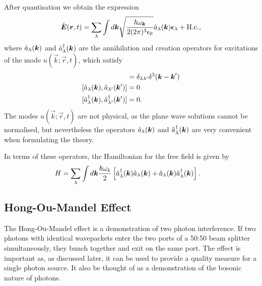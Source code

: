 After quantisation we obtain the expression
\begin{align}
  \hat{{\boldsymbol{E}}}({\boldsymbol{r}}, t) = \sum_\lambda \int d{\boldsymbol{k}} \sqrt{\frac{\hbar \omega_{{\boldsymbol{k}}}}{2(2\pi)^3\epsilon_0}}\hat{a}_\lambda({\boldsymbol{k}}){\boldsymbol{\epsilon}}_\lambda  + \text{H.c.},
\end{align}
where $\hat{a}_\lambda({\boldsymbol{k}})$ and $\hat{a}^\dagger_\lambda({\boldsymbol{k}})$ are the annihilation and creation operators for excitations of the mode $u(\vec{k}; \vec{r},t)$, which satisfy
\begin{align}
  [\an{a}_\lambda(\vec{k}), \cre{a}_{\lambda '}(\vec{k}')]  &= \delta_{\lambda\lambda '}\delta^3(\vec{k} - \vec{k}') \\
  [\an{a}_\lambda(\vec{k}), \an{a}_{\lambda '}(\vec{k}')]  &= 0 \\
  [\cre{a}_\lambda(\vec{k}), \cre{a}_{\lambda '}(\vec{k}')] &= 0.
\end{align}
The modes $u(\vec{k}; \vec{r}, t)$ are not physical, as the plane wave solutions cannot be normalised, but nevertheless the operators  $\hat{a}_\lambda({\boldsymbol{k}})$ and $\hat{a}^\dagger_\lambda({\boldsymbol{k}})$ are very convenient when formulating the theory.

In terms of these operators, the Hamiltonian for the free field is given by
\begin{align}
  H &= \sum_\lambda \int d{\boldsymbol{k}} \frac{\hbar\omega_k}{2} \left[ \hat{a}^\dagger_\lambda({\boldsymbol{k}})\hat{a}_\lambda({\boldsymbol{k}}) + \hat{a}_\lambda({\boldsymbol{k}})\hat{a}^\dagger_\lambda({\boldsymbol{k}}) \right].
\end{align}



\subsection{Hong-Ou-Mandel Effect} \label{HOM_section}

The Hong-Ou-Mandel effect is a demonstration of two photon interference. If two photons with identical wavepackets enter the two ports of a 50:50 beam splitter simultaneously, they bunch together and exit on the same port. The effect is important as, as discussed later, it can be used to provide a quality measure for a single photon source. It also be thought of as a demonstration of the bosonic nature of photons.

